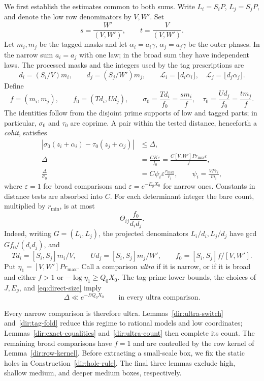 We first establish the estimates common to both sums. Write
$L_i=S_iP$, $L_j=S_jP$, and denote the low row denominators by $V,W'$.
Set
\[
 s=\frac{W'}{(V,W')},\qquad t=\frac{V}{(V,W')}.
\]
Let $m_i,m_j$ be the tagged masks and let
$\alpha_i=a_i\gamma$, $\alpha_j=a_j\gamma$ be the outer phases. In the
narrow sum $a_i=a_j$ with one law; in the broad sum they have independent
laws. The processed masks and the integers used by the tag prescriptions
are
\[
 d_i=(S_i/V)m_i,\qquad d_j=(S_j/W')m_j,
 \qquad \mathcal L_i=\lfloor d_i\alpha_i\rfloor,
 \quad \mathcal L_j=\lfloor d_j\alpha_j\rfloor.
\]
Define
\[
 f=(m_i,m_j),\qquad f_0=(Td_i,Ud_j),
 \qquad \sigma_0=\frac{Td_i}{f_0}=\frac{s m_i}{f},
 \quad \tau_0=\frac{Ud_j}{f_0}=\frac{t m_j}{f}.
\]
The identities follow from the disjoint prime supports of low and tagged
parts; in particular, $\sigma_0$ and $\tau_0$ are coprime. A pair within
the tested distance, henceforth a \emph{cohit}, satisfies
\begin{equation}\label{eq:direct-determinant}
 \begin{split}
 |\sigma_0(z_i+\alpha_i)-\tau_0(z_j+\alpha_j)|&\le\Delta,\\
 \Delta&=\frac{CK\varepsilon}{f_0}
        =\frac{C[V,W']P r_{\max}\varepsilon}{f},\\
 \frac{\Delta}{\sigma_0}
        &=C\psi_i\varepsilon\frac{r_{\max}}{r_i},
 \qquad \psi_i=\frac{VP r_i}{m_i},
 \end{split}
\end{equation}
where $\varepsilon=1$ for broad comparisons and
$\varepsilon=e^{-E_gX_0}$ for narrow ones. Constants in distance tests are
absorbed into $C$. For each determinant integer the bare count, multiplied
by $r_{\min}$, is at most
\[
 \Theta_{ij}\frac{f_0}{d_i d_j}.
\]
Indeed, writing $G=(L_i,L_j)$, the projected denominators
$L_i/d_i,L_j/d_j$ have gcd
$Gf_0/(d_i d_j)$, and
\[
 Td_i=[S_i,S_j]m_i/V,\qquad
 Ud_j=[S_i,S_j]m_j/W',\qquad
 f_0=[S_i,S_j]f/[V,W'].
\]
Put $\eta_1=[V,W']P r_{\max}$. Call a comparison \emph{ultra} if it is
narrow, or if it is broad and either $f>1$ or
$-\log\eta_1\ge Q_0X_0$. The tag-prime lower bounds, the choices of
$J,E_g$, and \eqref{eq:direct-size} imply
\[
 \Delta\ll e^{-.9Q_0X_0}
 \qquad\text{in every ultra comparison}.
\]

Every narrow comparison is therefore ultra. Lemmas~\ref{dir:ultra-switch}
and~\ref{dir:tag-fold} reduce this regime to rational models and low
coordinates; Lemmas~\ref{dir:exact-equalities} and~\ref{dir:ultra-count}
then complete its count. The remaining broad comparisons have $f=1$
and are controlled by the row kernel of Lemma~\ref{dir:row-kernel}.
Before extracting a small-scale box, we fix the static holes in
Construction~\ref{dir:hole-rule}. The final three lemmas exclude high,
shallow medium, and deeper medium boxes, respectively.


